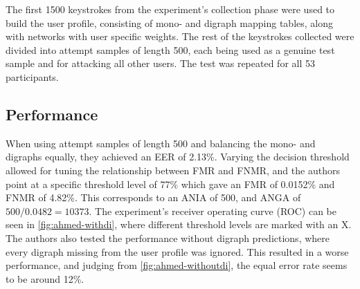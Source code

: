 \documentclass[informationsecurity]{gucmasterproject}
\begin{document}
The first 1500 keystrokes from the experiment's collection phase were used to build the user profile, consisting of mono- and digraph mapping tables, along with networks with user specific weights.
The rest of the keystrokes collected were divided into attempt samples of length 500, each being used as a genuine test sample and for attacking all other users.
The test was repeated for all 53 participants.

\subsection{Performance}
\label{sec:ahmed-performance}
When using attempt samples of length 500 and balancing the mono- and digraphs equally, they achieved an EER of 2.13\%.
Varying the decision threshold allowed for tuning the relationship between FMR and FNMR, and the authors point at a specific threshold level of 77\% which gave an FMR of 0.0152\% and FNMR of 4.82\%.
This corresponds to an ANIA of 500, and ANGA of $500 / 0.0482 = 10373$.
The experiment's receiver operating curve (ROC) can be seen in \cref{fig:ahmed-withdi}, where different threshold levels are marked with an X.
The authors also tested the performance without digraph predictions, where every digraph missing from the user profile was ignored.
This resulted in a worse performance, and judging from \cref{fig:ahmed-withoutdi}, the equal error rate seems to be around 12\%.
\end{document}
